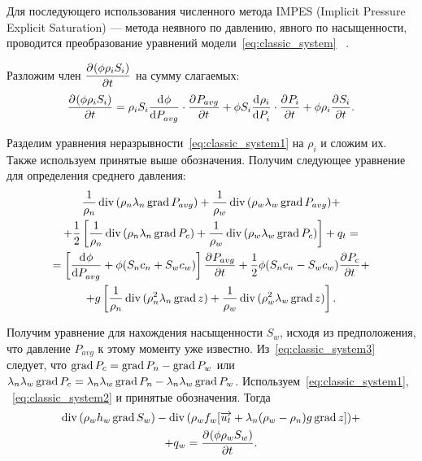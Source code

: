 Для последующего использования численного метода IMPES (Implicit Pressure Explicit Saturation) --- метода неявного по давлению,
явного по насыщенности, проводится преобразование уравнений модели~\eqref{eq:classic_system} ~\cite{Peaceman}.

Разложим член $\dfrac{\partial^{} (\phi \rho_i S_i)}{\partial t^{}}$ на сумму слагаемых:
\begin{equation}
 \dfrac{\partial^{} (\phi \rho_i S_i)}{\partial t^{}} = \rho_i S_i \dfrac{\mathrm d^{} \phi}{\mathrm d P_{avg}^{}} \cdot \dfrac{\partial^{} P_{avg}}{\partial t^{}}
 + \phi S_i \dfrac{\mathrm d^{} \rho_i}{\mathrm d P_i^{}} \cdot \dfrac{\partial^{} P_i}{\partial t^{}} + \phi \rho_i \dfrac{\partial^{} S_i}{\partial t^{}}.
\end{equation}

Разделим уравнения неразрывности~\eqref{eq:classic_system1} на $\rho_i$ 
и сложим их. Также используем принятые выше обозначения.
Получим следующее уравнение для определения среднего давления:
\begin{equation} \label{eq:classic_pressure}
 \begin{gathered}
  \frac{1}{\rho_n} \mathop{\mathrm{div}}\nolimits{ (\rho_n\lambda_n\mathop{\mathrm{grad}}\nolimits{ P_{avg}})} + \frac{1}{\rho_w} \mathop{\mathrm{div}}\nolimits{ (\rho_w\lambda_w\mathop{\mathrm{grad}}\nolimits{ P_{avg}})} +\\
  + \frac{1}{2} \left[ \frac{1}{\rho_n} \mathop{\mathrm{div}}\nolimits{ (\rho_n\lambda_n\mathop{\mathrm{grad}}\nolimits{ P_c})} + \frac{1}{\rho_w} \mathop{\mathrm{div}}\nolimits{ (\rho_w\lambda_w\mathop{\mathrm{grad}}\nolimits{ P_c})}\right] + q_t =\\
  = \left[ \dfrac{\mathrm d^{} \phi}{\mathrm d P_{avg}^{}} + \phi (S_n c_n + S_w c_w) \right] \dfrac{\partial^{} P_{avg}}{\partial t^{}} +
  \frac{1}{2} \phi (S_n c_n - S_w c_w) \dfrac{\partial^{} P_{c}}{\partial t^{}} +\\
  + g \left[ \frac{1}{\rho_n} \mathop{\mathrm{div}}\nolimits{ (\rho_n^2\lambda_n\mathop{\mathrm{grad}}\nolimits{ z})} + \frac{1}{\rho_w} \mathop{\mathrm{div}}\nolimits{ (\rho_w^2\lambda_w\mathop{\mathrm{grad}}\nolimits{ z})} \right].
 \end{gathered}
\end{equation}

Получим уравнение для нахождения насыщенности $S_w$, исходя из предположения,
что давление $P_{avg}$ к этому моменту уже известно.
Из~\eqref{eq:classic_system3} следует, что $\mathop{\mathrm{grad}}\nolimits{ P_c} = \mathop{\mathrm{grad}}\nolimits{ P_n} - \mathop{\mathrm{grad}}\nolimits{ P_w}$ или
$\lambda_n\lambda_w\mathop{\mathrm{grad}}\nolimits{ P_c} = \lambda_n\lambda_w\mathop{\mathrm{grad}}\nolimits{ P_n} - \lambda_n\lambda_w\mathop{\mathrm{grad}}\nolimits{ P_w}$.
Используем~\eqref{eq:classic_system1}, ~\eqref{eq:classic_system2} и принятые обозначения.
Тогда
\begin{equation} \label{eq:classic_saturation}
 \begin{gathered}
  \mathop{\mathrm{div}}\nolimits{(\rho_w h_w \mathop{\mathrm{grad}}\nolimits{ S_w})} - \mathop{\mathrm{div}}\nolimits{(\rho_w f_w[\overrightarrow{u_t} + \lambda_n(\rho_w - \rho_n)g \mathop{\mathrm{grad}}\nolimits{ z}])} + \\
  + q_w = \dfrac{\partial^{} (\phi \rho_w S_w)}{\partial t^{}}.
 \end{gathered}
\end{equation} 
 
